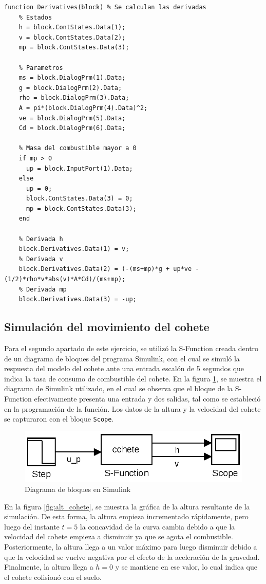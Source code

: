 \documentclass[12pt,letterpaper]{article}
\begin{document}
\begin{lstlisting}[style=Matlab-editor, basicstyle=\mlttfamily]
  function Derivatives(block) % Se calculan las derivadas
    % Estados
    h = block.ContStates.Data(1);
    v = block.ContStates.Data(2);
    mp = block.ContStates.Data(3);

    % Parametros
    ms = block.DialogPrm(1).Data;
    g = block.DialogPrm(2).Data;
    rho = block.DialogPrm(3).Data;
    A = pi*(block.DialogPrm(4).Data)^2;
    ve = block.DialogPrm(5).Data;
    Cd = block.DialogPrm(6).Data;

    % Masa del combustible mayor a 0
    if mp > 0
      up = block.InputPort(1).Data;
    else
      up = 0;
      block.ContStates.Data(3) = 0;
      mp = block.ContStates.Data(3);
    end

    % Derivada h
    block.Derivatives.Data(1) = v;
    % Derivada v
    block.Derivatives.Data(2) = (-(ms+mp)*g + up*ve -(1/2)*rho*v*abs(v)*A*Cd)/(ms+mp);
    % Derivada mp
    block.Derivatives.Data(3) = -up;     
\end{lstlisting}


\subsection{Simulación del movimiento del cohete}
Para el segundo apartado de este ejercicio, se utilizó la S-Function creada dentro de un diagrama de
bloques del programa Simulink, con el cual se simuló la respuesta del modelo del cohete ante una
entrada escalón de 5 segundos que indica la tasa de consumo de combustible del cohete. En la figura
\ref{fig:diag_simulink}, se muestra el diagrama de Simulink utilizado, en el cual se observa que el
bloque de la S-Function efectivamente presenta una entrada y dos salidas, tal como se estableció en
la programación de la función. Los datos de la altura y la velocidad del cohete se capturaron con el
bloque \texttt{Scope}.

\begin{figure}[ht!]
  \centering
  \includegraphics[width=0.5\linewidth]{pictures/Ejercicio3/simulink_cohete.eps}
  \caption{Diagrama de bloques en Simulink}
  \label{fig:diag_simulink}
\end{figure}

En la figura \ref{fig:alt_cohete}, se muestra la gráfica de la altura resultante de la
simulación. De esta forma, la altura empieza incrementado rápidamente, pero luego del instante $t=5$
la concavidad de la curva cambia debido a que la velocidad del cohete empieza a disminuir ya que se
agota el combustible. Posteriormente, la altura llega a un valor máximo para luego disminuir debido
a que la velocidad se vuelve negativa por el efecto de la aceleración de la gravedad. Finalmente, la
altura llega a $h=0$ y se mantiene en ese valor, lo cual indica que el cohete colisionó con el suelo.
\end{document}
